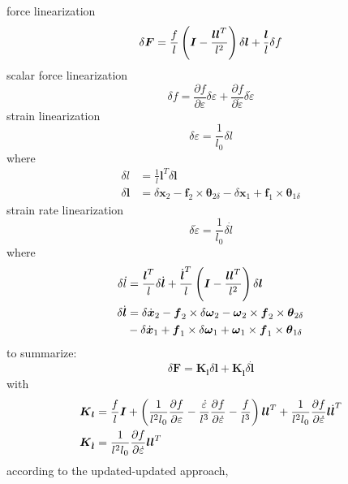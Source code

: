\documentclass[10pt,dvips,fleqn]{report}
\newcommand{\T}[1]{\boldsymbol{#1}}
\begin{document}
force linearization
\begin{equation}
	\delta\T{F} = \frac{f}{l}\plbr{\T{I} - \frac{\T{l}\T{l}^T}{l^2}} \delta\T{l} + \frac{\T{l}}{l} \delta{f}
\end{equation}
scalar force linearization
\begin{equation}
	\delta{f} = \frac{\partial{f}}{\partial\varepsilon} \delta\varepsilon
	+ \frac{\partial{f}}{\partial\dot{\varepsilon}} \delta\dot{\varepsilon}
\end{equation}
strain linearization
\begin{equation}
	\delta\varepsilon = \frac{1}{l_0}\delta{l}
\end{equation}
where
\begin{align}
	\delta{l} &= \frac{1}{l}\T{l}^T \delta\T{l} \\
	\delta\T{l} &= \delta\T{x}_2 - \T{f}_2 \times \T{\theta}_{2\delta}
		- \delta\T{x}_1 + \T{f}_1 \times \T{\theta}_{1\delta}
\end{align}
strain rate linearization
\begin{equation}
	\delta\dot{\varepsilon} = \frac{1}{l_0} \delta\dot{l}
\end{equation}
where
\begin{align}
	\delta\dot{l} &= \frac{\T{l}^T}{l} \delta\dot{\T{l}}
		+ \frac{\dot{\T{l}}^T}{l}\plbr{\T{I} - \frac{\T{l}\T{l}^T}{l^2}} \delta\T{l} \\
	\delta\dot{\T{l}} &= \delta\dot{\T{x}}_2
		- \T{f}_2 \times \delta\T{\omega}_2 - \T{\omega}_2 \times \T{f}_2 \times \T{\theta}_{2\delta}
		\nonumber \\
		& \mbox{} - \delta\dot{\T{x}}_1
		+ \T{f}_1 \times \delta\T{\omega}_1 + \T{\omega}_1 \times \T{f}_1 \times \T{\theta}_{1\delta}
\end{align}
to summarize:
\begin{equation}
	\delta\T{F} = \T{K}_{\T{l}} \delta\T{l} + \T{K}_{\dot{\T{l}}} \delta\dot{\T{l}}
\end{equation}
with
\begin{align}
	\T{K}_{\T{l}} &= \frac{f}{l} \T{I}
		+ \plbr{
			\frac{1}{l^2 l_0} \frac{\partial{f}}{\partial\varepsilon}
			- \frac{\dot{\varepsilon}}{l^3} \frac{\partial{f}}{\partial\dot{\varepsilon}}
			- \frac{f}{l^3}
		}\T{l}\T{l}^T
		+ \frac{1}{l^2 l_0} \frac{\partial{f}}{\partial\dot{\varepsilon}} \T{l}\dot{\T{l}}^T \\
	\T{K}_{\dot{\T{l}}} &= \frac{1}{l^2 l_0} \frac{\partial{f}}{\partial\dot{\varepsilon}} \T{l}\T{l}^T
\end{align}
according to the updated-updated approach,
\end{document}
